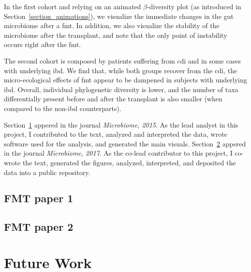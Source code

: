 \documentclass[12pt,chapterheads]{ucsd}
\begin{document}
In the first cohort and relying on an animated $\beta$-diversity plot (as 
introduced in Section~\ref{section_animations}), we visualize the immediate 
changes in the gut microbiome after a \gls{fmt}. In addition, we also visualize 
the stability of the microbiome after the transplant, and note that the only 
point of instability occurs right after the \gls{fmt}.

The second cohort is composed by patients suffering from \gls{cdi} and in some 
cases with underlying \gls{ibd}. We find that, while both groups recover from 
the \gls{cdi}, the micro-ecological effects of \gls{fmt} appear to be dampened 
in subjects with underlying \gls{ibd}. Overall, individual phylogenetic 
diversity is lower, and the number of taxa differentially present before and 
after the transplant is also smaller (when compared to the non-\gls{ibd} 
counterparts).

Section~\ref{section_moviefmt} appered in the journal \textsl{Microbiome, 
2015}. As the lead analyst in this project, I contributed to the text, analyzed 
and interpreted the data, wrote software used for the analysis, and generated 
the main visuals.  Section~\ref{section_fmt} appered in the journal 
\textsl{Microbiome, 2017}. As the co-lead contributor to this project, I 
co-wrote the text, generated the figures, analyzed, interpreted, and deposited 
the data into a public repository.

\ifdefined\RELEASE
    
    
\else
    \section{FMT paper 1}\label{section_moviefmt}
    \section{FMT paper 2}\label{section_fmt}
\fi

\chapter{Future Work}






\printindex %


\end{document}
